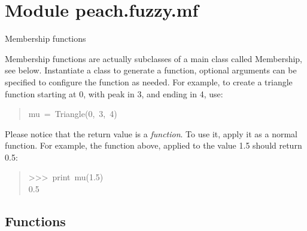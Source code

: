 %
%
%


\section{Module peach.fuzzy.mf}

    \label{peach:fuzzy:mf}

Membership functions

Membership functions are actually subclasses of a main class called Membership,
see below. Instantiate a class to generate a function, optional arguments can be
specified to configure the function as needed. For example, to create a triangle
function starting at 0, with peak in 3, and ending in 4, use:
%
\begin{quote}{\ttfamily \raggedright \noindent
mu~=~Triangle(0,~3,~4)
}
\end{quote}

Please notice that the return value is a \emph{function}. To use it, apply it as a
normal function. For example, the function above, applied to the value 1.5
should return 0.5:
%
\begin{quote}{\ttfamily \raggedright \noindent
>{}>{}>~print~mu(1.5)\\
0.5
}
\end{quote}


  \subsection{Functions}

    \label{peach:fuzzy:mf:Saw}

    \vspace{0.5ex}

